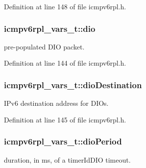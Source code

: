 Definition at line 148 of file icmpv6rpl.\+h.

\subsubsection[{\texorpdfstring{dio}{dio}}]{ icmpv6rpl\+\_\+vars\+\_\+t\+::dio}\hypertarget{structicmpv6rpl__vars__t_aef29142663a295dfcf77c05204af83ed}{}\label{structicmpv6rpl__vars__t_aef29142663a295dfcf77c05204af83ed}


pre-\/populated D\+IO packet. 



Definition at line 144 of file icmpv6rpl.\+h.

\subsubsection[{\texorpdfstring{dio\+Destination}{dioDestination}}]{ icmpv6rpl\+\_\+vars\+\_\+t\+::dio\+Destination}\hypertarget{structicmpv6rpl__vars__t_a259f71b16f9219c3288db599d441c72e}{}\label{structicmpv6rpl__vars__t_a259f71b16f9219c3288db599d441c72e}


I\+Pv6 destination address for D\+I\+Os. 



Definition at line 145 of file icmpv6rpl.\+h.

\subsubsection[{\texorpdfstring{dio\+Period}{dioPeriod}}]{ icmpv6rpl\+\_\+vars\+\_\+t\+::dio\+Period}\hypertarget{structicmpv6rpl__vars__t_a0c59f60a251aa855db9b7eea7fb4adda}{}\label{structicmpv6rpl__vars__t_a0c59f60a251aa855db9b7eea7fb4adda}


duration, in ms, of a timer\+Id\+D\+IO timeout. 



